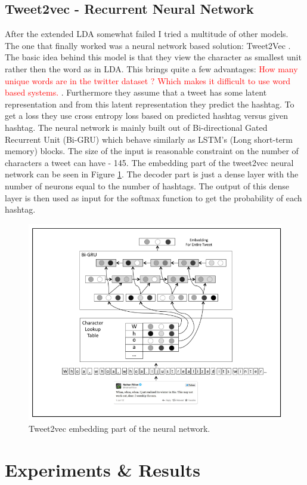 \documentclass[10pt,conference,compsocconf]{IEEEtran}
\newcommand\todo[1]{\textcolor{red}{#1}}
\begin{document}
\subsection{Tweet2vec - Recurrent Neural Network}
After the extended LDA somewhat failed I tried a multitude of other models. The one that finally worked was a neural network based solution: Tweet2Vec \cite{DhingraZFMC16}. The basic idea behind this model is that they view the character as smallest unit rather then the word as in LDA. This brings quite a few advantages: \todo{How many unique words are in the twitter dataset ? Which makes it difficult to use word based systems. }. Furthermore they assume that a tweet has some latent representation and from this latent representation they predict the hashtag. To get a loss they use cross entropy loss based on predicted hashtag versus given hashtag. The neural network is mainly built out of Bi-directional Gated Recurrent Unit (Bi-GRU) which behave similarly as LSTM's (Long short-term memory) blocks. The size of the input is reasonable constraint on the number of characters a tweet can have - 145. The embedding part of the tweet2vec neural network can be seen in Figure \ref{fig:tweet2vecembedding}. The decoder part is just a dense layer with the number of neurons equal to the number of hashtags. The output of this dense layer is then used as input for the softmax function to get the probability of each hashtag. 
\begin{figure}
	\centering
	\includegraphics[width=0.7\linewidth]{images/tweet2vec_embedding}
	\caption{Tweet2vec embedding part of the neural network.}
	\label{fig:tweet2vecembedding}
\end{figure}


\section{Experiments \& Results}
\label{sec:Experiments}
\end{document}
